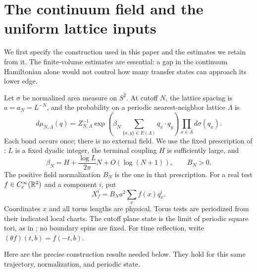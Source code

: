 \section{The continuum field and the uniform lattice inputs}
\label{sec:inputs}

We first specify the construction used in this paper and the estimates
we retain from it.  The finite-volume estimates are essential: a gap in
the continuum Hamiltonian alone would not control how many transfer
states can approach its lower edge.

Let $\sigma$ be normalized area measure on $S^2$.  At cutoff $N$, the
lattice spacing is $a=a_N=L^{-N}$, and the probability on a periodic
nearest-neighbor lattice $\Lambda$ is
\begin{equation}
 d\mu_{N,\Lambda}(q)
 =Z_{N,\Lambda}^{-1}
   \exp\!\left(\beta_N\sum_{\{x,y\}\in E(\Lambda)}q_x\cdot q_y\right)
   \prod_{x\in\Lambda}d\sigma(q_x).
 \label{inp:lattice}
\end{equation}
Each bond occurs once; there is no external field.  We use the fixed
prescription of \cite[Theorem~1.2]{OpenAI-O3}: $L$ is a fixed dyadic
integer, the terminal coupling $H$ is sufficiently large, and
\[
 \beta_N=H+\frac{\log L}{2\pi}N+O(\log(N+1)),\qquad B_N>0.
\]
The positive field normalization $B_N$ is the one in that prescription.
For a real test $f\in C_c^\infty(\mathbb R^2)$ and a component $i$, put
\begin{equation}
 X_f^i=B_Na^2\sum_x f(x)q_x^i.
 \label{inp:field}
\end{equation}
Coordinates $x$ and all torus lengths are physical.  Torus tests are
periodized from their indicated local charts.  The cutoff plane state
is the limit of periodic square tori, as in
\cite[Proposition~2.1]{OpenAI-O3}; no boundary spins are fixed.
For time reflection, write $(\theta f)(t,b)=f(-t,b)$.

Here are the precise construction results needed below.  They hold for
this same trajectory, normalization, and periodic state.

